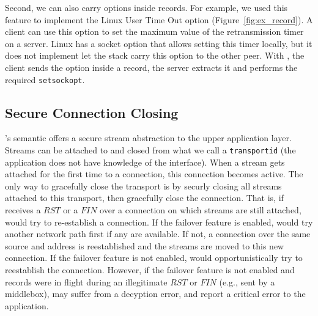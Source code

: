 Second, we can also carry \tcp options inside \tls records. For example, we used
this feature to implement the Linux \tcp User Time Out option
(Figure~\ref{fig:ex_record}). A client
can use this option to set the maximum value of the retransmission
timer on a server. Linux \tcp has a socket option that allows setting
this timer locally, but it does not implement let the stack carry this \tcp
option to the other peer. With \tcpls, the client sends the option inside a \tls
record, the server extracts it and performs the required \texttt{setsockopt}.


\subsection{Secure Connection Closing}

\tcpls's semantic offers a secure stream abstraction to the upper application
layer.
Streams can be attached to and closed from what we call a \texttt{transportid}
(the application does not have knowledge of the \tcp interface). When a stream
gets attached for the first time to a \tcp connection, this connection becomes
active. The only way to gracefully close the transport is by securly closing all
streams attached to this transport, then \tcpls gracefully close the \tcp
connection. That is, if \tcpls receives a $RST$ or a $FIN$ over a \tcp
connection on which streams are still attached, \tcpls would try to re-establish
a \tcp connection. If the failover feature is enabled, \tcpls would try another
network path first if any are available. If not, a connection over the same
source and address is reestablished and the streams are moved to this new \tcp
connection. If the failover feature is not enabled, \tcpls would opportunistically try to
reestablish the connection. However, if the failover feature is not enabled and
records were in flight during an illegitimate $RST$ or $FIN$ (e.g., sent by a
middlebox), \tcpls may suffer from a decyption error, and report a critical
error to the application.



